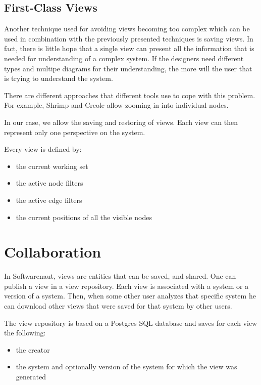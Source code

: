 \documentclass[preprint,12pt]{elsarticle}
\begin{document}
\newpage
\subsection {First-Class Views}

Another technique used for avoiding views becoming too complex which can be used in combination with the previously presented techniques is saving views. In fact, there is little hope that a single view can present all the information that is needed for understanding of a complex system. If the designers need different types and multipe diagrams for their understanding, the more will the user that is trying to understand the system. 

There are different approaches that different tools use to cope with this problem. For example, Shrimp and Creole allow zooming in into individual nodes. 

In our case, we allow the saving and restoring of views. Each view can then represent only one perspective on the system. 

Every view is defined by:

\begin{itemize}
\item the current working set
\item the active node filters
\item the active edge filters
\item the current positions of all the visible nodes
\end{itemize}



\section {Collaboration}
\label {sec:collab}

In Softwarenaut, views are entities that can be saved, and shared. One can publish a view in a view repository. Each view is associated with a system or a version of a system. Then, when some other user analyzes that specific system he can download other views that were saved for that system by other users. 

The view repository is based on a Postgres SQL database and saves for each view the following:

\begin{itemize}
\item the creator
\item the system and optionally version of the system for which the view was generated
\end{itemize}
\end{document}
